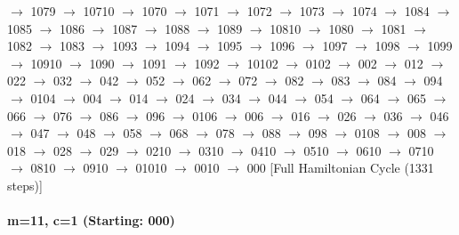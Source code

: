 $\rightarrow$ 1079 $\rightarrow$ 10710 $\rightarrow$ 1070 $\rightarrow$ 1071 $\rightarrow$ 1072 $\rightarrow$ 1073 $\rightarrow$ 1074 $\rightarrow$ 1084 $\rightarrow$ 1085 $\rightarrow$ 1086 $\rightarrow$ 1087 $\rightarrow$ 1088 $\rightarrow$ 1089 $\rightarrow$ 10810 $\rightarrow$ 1080 $\rightarrow$ 1081 $\rightarrow$ 1082 $\rightarrow$ 1083 $\rightarrow$ 1093 $\rightarrow$ 1094 $\rightarrow$ 1095 $\rightarrow$ 1096 $\rightarrow$ 1097 $\rightarrow$ 1098 $\rightarrow$ 1099 $\rightarrow$ 10910 $\rightarrow$ 1090 $\rightarrow$ 1091 $\rightarrow$ 1092 $\rightarrow$ 10102 $\rightarrow$ 0102 $\rightarrow$ 002 $\rightarrow$ 012 $\rightarrow$ 022 $\rightarrow$ 032 $\rightarrow$ 042 $\rightarrow$ 052 $\rightarrow$ 062 $\rightarrow$ 072 $\rightarrow$ 082 $\rightarrow$ 083 $\rightarrow$ 084 $\rightarrow$ 094 $\rightarrow$ 0104 $\rightarrow$ 004 $\rightarrow$ 014 $\rightarrow$ 024 $\rightarrow$ 034 $\rightarrow$ 044 $\rightarrow$ 054 $\rightarrow$ 064 $\rightarrow$ 065 $\rightarrow$ 066 $\rightarrow$ 076 $\rightarrow$ 086 $\rightarrow$ 096 $\rightarrow$ 0106 $\rightarrow$ 006 $\rightarrow$ 016 $\rightarrow$ 026 $\rightarrow$ 036 $\rightarrow$ 046 $\rightarrow$ 047 $\rightarrow$ 048 $\rightarrow$ 058 $\rightarrow$ 068 $\rightarrow$ 078 $\rightarrow$ 088 $\rightarrow$ 098 $\rightarrow$ 0108 $\rightarrow$ 008 $\rightarrow$ 018 $\rightarrow$ 028 $\rightarrow$ 029 $\rightarrow$ 0210 $\rightarrow$ 0310 $\rightarrow$ 0410 $\rightarrow$ 0510 $\rightarrow$ 0610 $\rightarrow$ 0710 $\rightarrow$ 0810 $\rightarrow$ 0910 $\rightarrow$ 01010 $\rightarrow$ 0010 $\rightarrow$ 000 
[Full Hamiltonian Cycle (1331 steps)]


\paragraph{ m=11, c=1 (Starting: 000)}



